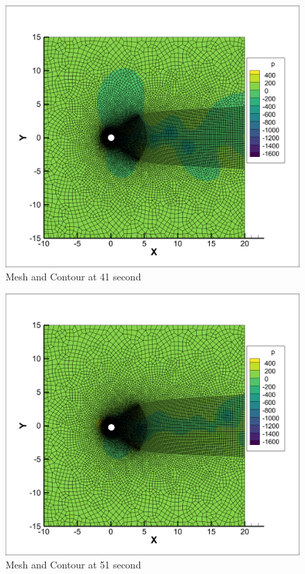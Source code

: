 \documentclass[a4paper,12pt]{article} %
\begin{document}
\begin{figure}[htbp]
    \center
    \includegraphics[scale=0.3]{41.png}
    \caption{Mesh and Contour at 41 second}
\end{figure}
\begin{figure}[htbp]
    \center
    \includegraphics[scale=0.3]{51.png}
    \caption{Mesh and Contour at 51 second}
\end{figure}
\end{document}
